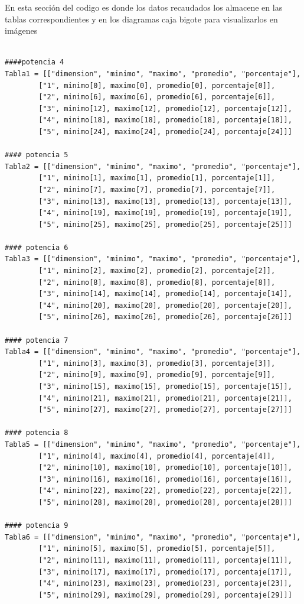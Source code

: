 \documentclass[a4paper]{article}
\begin{document}
En esta sección del codigo es donde los datos recaudados los almacene en las tablas correspondientes y en los diagramas caja bigote para visualizarlos en imágenes
\begin{verbatim}
    
####potencia 4
Tabla1 = [["dimension", "minimo", "maximo", "promedio", "porcentaje"],
        ["1", minimo[0], maximo[0], promedio[0], porcentaje[0]],
        ["2", minimo[6], maximo[6], promedio[6], porcentaje[6]],
        ["3", minimo[12], maximo[12], promedio[12], porcentaje[12]],
        ["4", minimo[18], maximo[18], promedio[18], porcentaje[18]],
        ["5", minimo[24], maximo[24], promedio[24], porcentaje[24]]]

#### potencia 5
Tabla2 = [["dimension", "minimo", "maximo", "promedio", "porcentaje"],
        ["1", minimo[1], maximo[1], promedio[1], porcentaje[1]],
        ["2", minimo[7], maximo[7], promedio[7], porcentaje[7]],
        ["3", minimo[13], maximo[13], promedio[13], porcentaje[13]],
        ["4", minimo[19], maximo[19], promedio[19], porcentaje[19]],
        ["5", minimo[25], maximo[25], promedio[25], porcentaje[25]]]

#### potencia 6
Tabla3 = [["dimension", "minimo", "maximo", "promedio", "porcentaje"],
        ["1", minimo[2], maximo[2], promedio[2], porcentaje[2]],
        ["2", minimo[8], maximo[8], promedio[8], porcentaje[8]],
        ["3", minimo[14], maximo[14], promedio[14], porcentaje[14]],
        ["4", minimo[20], maximo[20], promedio[20], porcentaje[20]],
        ["5", minimo[26], maximo[26], promedio[26], porcentaje[26]]]

#### potencia 7
Tabla4 = [["dimension", "minimo", "maximo", "promedio", "porcentaje"],
        ["1", minimo[3], maximo[3], promedio[3], porcentaje[3]],
        ["2", minimo[9], maximo[9], promedio[9], porcentaje[9]],
        ["3", minimo[15], maximo[15], promedio[15], porcentaje[15]],
        ["4", minimo[21], maximo[21], promedio[21], porcentaje[21]],
        ["5", minimo[27], maximo[27], promedio[27], porcentaje[27]]]

#### potencia 8
Tabla5 = [["dimension", "minimo", "maximo", "promedio", "porcentaje"],
        ["1", minimo[4], maximo[4], promedio[4], porcentaje[4]],
        ["2", minimo[10], maximo[10], promedio[10], porcentaje[10]],
        ["3", minimo[16], maximo[16], promedio[16], porcentaje[16]],
        ["4", minimo[22], maximo[22], promedio[22], porcentaje[22]],
        ["5", minimo[28], maximo[28], promedio[28], porcentaje[28]]]

#### potencia 9
Tabla6 = [["dimension", "minimo", "maximo", "promedio", "porcentaje"],
        ["1", minimo[5], maximo[5], promedio[5], porcentaje[5]],
        ["2", minimo[11], maximo[11], promedio[11], porcentaje[11]],
        ["3", minimo[17], maximo[17], promedio[17], porcentaje[17]],
        ["4", minimo[23], maximo[23], promedio[23], porcentaje[23]],
        ["5", minimo[29], maximo[29], promedio[29], porcentaje[29]]]


\end{verbatim}
\end{document}
